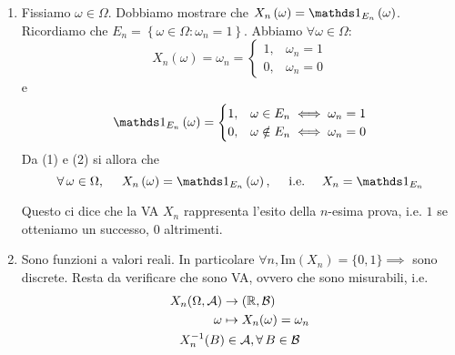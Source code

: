 \begin{enumerate}
\item Fissiamo $\omega \in \Omega $. Dobbiamo mostrare che $X_{n}\left(\omega \right) =\Ind_{E_{n}}\left(\omega \right)$. Ricordiamo che $E_{n} =\left\{\omega \in \Omega :\omega_{n} =1\right\}$. Abbiamo $\forall \omega \in \Omega $:
\begin{equation}
X_{n}\left(\omega \right) =\omega_{n} =
\begin{cases}
1, & \omega_{n} =1\\
0, & \omega_{n} =0
\end{cases}
\end{equation}
e
\begin{equation}
\Ind_{E_{n}}\left(\omega \right) =
\begin{cases}
1, & \omega \in E_{n} \iff \omega_{n} =1\\
0, & \omega \notin E_{n} \iff \omega_{n} =0
\end{cases}
\end{equation}
Da (1) e (2) si allora che
\begin{equation*}
\forall \omega \in \Omega ,\ \ \ \ X_{n}\left(\omega \right) =\Ind_{E_{n}}\left(\omega \right) ,\ \ \ \ \text{i.e.} \ \ \ \ X_{n} =\Ind_{E_{n}}
\end{equation*}

\begin{rem}
Questo ci dice che la VA $X_{n}$ rappresenta l'esito della $n$-esima prova, i.e. $1$ se otteniamo un successo, $0$ altrimenti.
\end{rem}
\item Sono funzioni a valori reali. In particolare $\forall n,\mathrm{Im}(X_{n}) =\{0,1\} \implies $ sono discrete. Resta da verificare che sono VA, ovvero che sono misurabili, i.e.
\begin{gather*}
\begin{aligned}
X_{n}(\Omega ,\Ac) & \rightarrow (\RR ,\mathcal{B})\\
\omega  & \mapsto X_{n}(\omega) =\omega_{n}
\end{aligned}\\
X_{n}^{-1}(B) \in \Ac ,\forall B\in \mathcal{B}
\end{gather*}


\end{enumerate}
